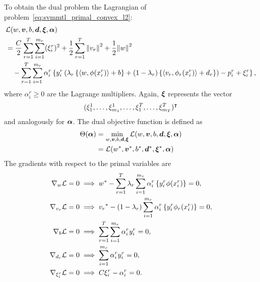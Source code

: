  To obtain the dual problem the Lagrangian of problem~\eqref{eq:svmmtl_primal_convex_l2}:
\begin{equation}\label{eq:svmmtl_lagrangian_convex_l2}
    \begin{aligned}
        & \lagr({w}, \fv{v}, b, \fv{d}, \fv{\xi}, \fv{\alpha}) \\
        &=  \frac{C}{2} \sum_{r= 1}^T \sum_{i=1}^{m_r} ({\xi_{i}^r})^2 + \frac{1}{2} \sum_{r= 1}^T{\norm{{v}_r}^2} + \frac{1}{2} {\norm{{w}}}^2 \\
        &\quad -  \sum_{r= 1}^T \sum_{i=1}^{m_r} \alpha_i^r \left\lbrace y_{i}^r  \left(\lambda_r \left\lbrace \dotp{w}{\phi(x_{i}^r)} + b  \right\rbrace + (1 - \lambda_r) \left\lbrace \dotp{{v}_r}{\phi_r(x_{i}^r)} + d_r \right\rbrace  \right) - p_{i}^r + \xi_{i}^r  \right\rbrace ,
    \end{aligned}
\end{equation}
where $\alpha_i^r \geq 0$ are the Lagrange multipliers. Again, $\bm{\xi}$ represents the vector $$(\xi_1^1, \ldots, \xi_{m_1}^1, \ldots, \xi_1^T, \ldots, \xi_{m_T}^T)^\intercal$$ and analogously for $\bm{\alpha}$. The dual objective function is defined as 
\begin{equation}\nonumber
    \begin{aligned}
         \Theta(\bm{\alpha}) &=  \min_{{w}, \bm{v}, b, \bm{d}, \bm{\xi}} \mathcal{L}({w}, \bm{v}, b, \bm{d}, \bm{\xi}, \bm{\alpha}) \\
         &= \mathcal{L}({{w}}^*, {\bm{v}}^*, {b}^*, {\bm{d}}^*, {\bm{\xi}}^*, \bm{\alpha})
    \end{aligned}    
\end{equation}
The gradients with respect to the primal variables are
\begin{align}
    \grad_{{w}} \lagr = 0  &\implies \optim{{w}} - \sum_{r= 1}^\ntasks \lambda_r \sum_{i=1}^{m_r} {\alpha_i^r} \left\lbrace y_i^r \phi(x_i^r) \right\rbrace = 0 , \label{eq:common_repr_conv_l2} \\
    \grad_{{v}_r} \lagr = 0 &\implies \optim{{v}_r} - (1 - \lambda_r) \sum_{i=1}^{m_r} {\alpha_i^r} \left\lbrace y_i^r \phi_r(x_i^r) \right\rbrace = 0 , \label{eq:specific_repr_conv_l2} \\
    \grad_{b} \lagr = 0  &\implies \sum_{r= 1}^T \sum_{i=1}^{m_r} {\alpha_i^r} y_i^r = 0 , \label{eq:specific_eqconstr_conv_l2}  \\
    \grad_{{d}_r} \lagr = 0 &\implies \sum_{i=1}^{m_r} {\alpha_i^r} y_i^r = 0 , \label{eq:common_eqconstr_conv_l2} \\
    \grad_{\xi_i^r} \lagr = 0 &\implies C \xi_i^r - {\alpha_i^r} = 0 . \label{eq:xi_feas_conv_l2}
\end{align}
